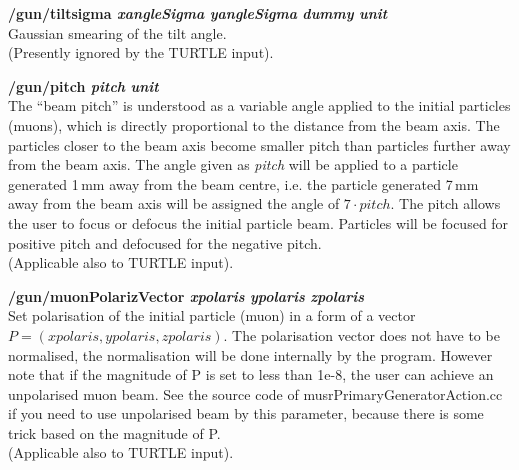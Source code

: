 \documentclass[twoside]{dis04}
\begin{document}
\begin{description}
\item{\bf /gun/tiltsigma \emph{xangleSigma} \emph{yangleSigma} \emph{dummy} \emph{unit}}\\
	Gaussian smearing of the tilt angle.\\
	(Presently ignored by the TURTLE input).

\item{\bf /gun/pitch \emph{pitch} \emph{unit}}\\
	The ``beam pitch'' is understood as a variable angle applied to the initial particles
        (muons), which is directly proportional to the distance from the beam axis.
	The particles closer to the beam axis become smaller pitch than particles further away
	from the beam axis.  
	The angle given as \emph{pitch} will be applied to a particle generated 1\,mm away from the
	beam centre, i.e. the particle generated 7\,mm away from the beam axis will be assigned
        the angle of $7\cdot pitch$.
	The pitch allows the user to focus or defocus the initial particle
	beam. Particles will be focused for positive pitch and defocused for the negative pitch.\\
	(Applicable also to TURTLE input).

\item{\bf /gun/muonPolarizVector \emph{xpolaris} \emph{ypolaris} \emph{zpolaris}}\\
	Set polarisation of the initial particle (muon) in a form of a vector 
	$P=(xpolaris,ypolaris,zpolaris)$.  The polarisation vector does not have to be normalised,
	the normalisation will be done internally by the program.
	However note that if the magnitude of P is set to less than 1e-8, the user can 
	achieve an unpolarised muon beam.  See the source code of musrPrimaryGeneratorAction.cc
	if you need to use unpolarised beam by this parameter, because there is some trick
        based on the magnitude of P.\\
	(Applicable also to TURTLE input).


\end{description}
\end{document}
